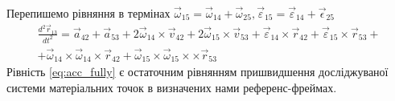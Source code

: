 \documentclass[12pt]{article}
\begin{document}
 	Перепишемо рівняння в термінах $\vec{\omega}_{15} = \vec{\omega}_{14} + \vec{\omega}_{25},  \vec{\varepsilon}_{15} =  \vec{\varepsilon}_{14} +  \vec{\epsilon}_{25}$
 	\begin{multline}
 	\label {eq:acc_fully}
 	\frac{d^2\vec{r}_{13}}{d t^2} = \vec{a}_{42} + \vec{a}_{53} + 2 \vec{\omega}_{14} \times \vec{v}_{42} + 2 \vec{\omega}_{15} \times \vec{v}_{53} + \vec{\varepsilon}_{14} \times \vec{r}_{42} + \vec{\varepsilon}_{15} \times \vec{r}_{53} + \\ + \vec{\omega}_{14} \times \vec{\omega}_{14} \times \vec{r}_{42} + \vec{\omega}_{15} \times \vec{\omega}_{15} \times \times \vec{r}_{53}
 	\end{multline}
 	Рівність \ref{eq:acc_fully} є остаточним рівнянням пришвидшення досліджуваної системи матеріальних точок в визначених нами референс-фреймах.
 
\end{document}
